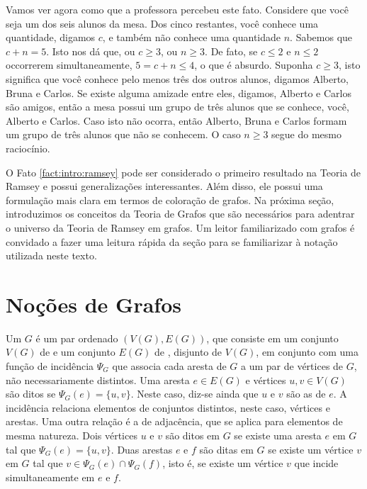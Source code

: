 Vamos ver agora como que a professora percebeu este fato. Considere que você seja um dos seis alunos da mesa. Dos cinco restantes, você conhece uma quantidade, digamos $c$, e também não conhece uma quantidade $n$. Sabemos que $c + n = 5$. Isto nos dá que, ou $c \geq 3$, ou $n \geq 3$. De fato, se $c \leq 2$ e $n \leq 2$ occorrerem simultaneamente, $5 = c + n \leq 4$, o que é absurdo. Suponha $c \geq 3$, isto significa que você conhece pelo menos três dos outros alunos, digamos Alberto, Bruna e Carlos. Se existe alguma amizade entre eles, digamos, Alberto e Carlos são amigos, então a mesa possui um grupo de três alunos que se conhece, você, Alberto e Carlos. Caso isto não ocorra, então Alberto, Bruna e Carlos formam um grupo de três alunos que não se conhecem. O caso $n \geq 3$ segue do mesmo raciocínio.

O Fato \ref{fact:intro:ramsey} pode ser considerado o primeiro resultado na Teoria de Ramsey e possui generalizações interessantes. Além disso, ele possui uma formulação mais clara em termos de coloração de grafos. Na próxima seção, introduzimos os conceitos da Teoria de Grafos que são necessários para adentrar o universo da Teoria de Ramsey em grafos. Um leitor familiarizado com grafos é convidado a fazer uma leitura rápida da seção para se familiarizar à notação utilizada neste texto.


\section{Noções de Grafos}

Um  $G$ é um par ordenado $(V(G), E(G))$, que consiste em um conjunto $V(G)$ de  e um conjunto $E(G)$ de , disjunto de $V(G)$, em conjunto com uma função de incidência $\Psi_G$ que associa cada aresta de $G$ a um par de vértices de $G$, não necessariamente distintos.
Uma aresta $e \in E(G)$ e vértices $u, v \in V(G)$ são ditos  se $\Psi_G(e) = \{u,v\}$. Neste caso, diz-se ainda que $u$ e $v$ são as  de $e$. A incidência relaciona elementos de conjuntos distintos, neste caso, vértices e arestas.
Uma outra relação é a de adjacência, que se aplica para elementos de mesma natureza. Dois vértices $u$ e $v$ são ditos  em $G$ se existe uma aresta $e$ em $G$ tal que $\Psi_G(e) = \{u,v\}$. Duas arestas $e$ e $f$ são ditas  em $G$ se existe um vértice $v$ em $G$ tal que $v \in \Psi_G(e) \cap \Psi_G(f)$, isto é, se existe um vértice $v$ que incide simultaneamente em $e$ e $f$.

